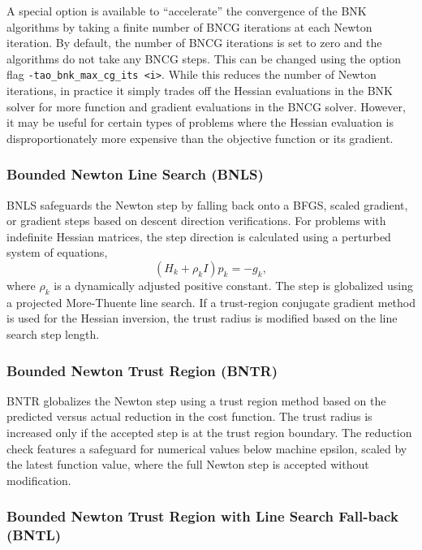 \documentclass[]{book}
\begin{document}
A special option is available to ``accelerate'' the convergence of the BNK algorithms by taking a finite 
number of BNCG iterations at each Newton iteration. By default, the number of BNCG iterations is set to zero 
and the algorithms do not take any BNCG steps. This can be changed using the option flag 
{\tt -tao\_bnk\_max\_cg\_its <i>}. While this reduces the number of Newton iterations, in practice it simply 
trades off the Hessian evaluations in the BNK solver for more function and gradient evaluations in the BNCG 
solver. However, it may be useful for certain types of problems where the Hessian evaluation is 
disproportionately more expensive than the objective function or its gradient.

\subsubsection{Bounded Newton Line Search (BNLS)}\label{sec:bnls}

BNLS safeguards the Newton step by falling back onto a BFGS, scaled gradient, or gradient 
steps based on descent direction verifications. For problems with indefinite Hessian matrices, 
the step direction is calculated using a perturbed system of equations,
\[
(H_k + \rho_k I)p_k = -g_k,
\]
where $\rho_k$ is a dynamically adjusted positive constant. The step is globalized using a 
projected More-Thuente line search. If a trust-region conjugate gradient method is used for the 
Hessian inversion, the trust radius is modified based on the line search step length.

\subsubsection{Bounded Newton Trust Region (BNTR)}\label{sec:bntr}

BNTR globalizes the Newton step using a trust region method based on the predicted versus 
actual reduction in the cost function. The trust radius is increased only if the accepted 
step is at the trust region boundary. The reduction check features a safeguard for numerical 
values below machine epsilon, scaled by the latest function value, where the full Newton step 
is accepted without modification.

\subsubsection{Bounded Newton Trust Region with Line Search Fall-back (BNTL)}\label{sec:bntr}
\end{document}
